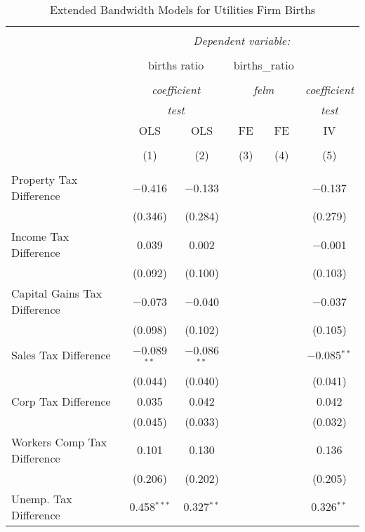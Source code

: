 
\begin{table}[!htbp] \centering 
  \caption{Extended Bandwidth Models for  Utilities Firm Births} 
  \label{} 
\begin{tabular}{@{\extracolsep{5pt}}lccccc} 
\\[-1.8ex]\hline 
\hline \\[-1.8ex] 
 & \multicolumn{5}{c}{\textit{Dependent variable:}} \\ 
\cline{2-6} 
\\[-1.8ex] & \multicolumn{2}{c}{births ratio} & \multicolumn{2}{c}{births\_ratio} &   \\ 
\\[-1.8ex] & \multicolumn{2}{c}{\textit{coefficient}} & \multicolumn{2}{c}{\textit{felm}} & \textit{coefficient} \\ 
 & \multicolumn{2}{c}{\textit{test}} & \multicolumn{2}{c}{\textit{}} & \textit{test} \\ 
 & OLS & OLS & FE & FE & IV \\ 
\\[-1.8ex] & (1) & (2) & (3) & (4) & (5)\\ 
\hline \\[-1.8ex] 
 Property Tax Difference & $-$0.416 & $-$0.133 &  &  & $-$0.137 \\ 
  & (0.346) & (0.284) &  &  & (0.279) \\ 
  Income Tax Difference & 0.039 & 0.002 &  &  & $-$0.001 \\ 
  & (0.092) & (0.100) &  &  & (0.103) \\ 
  Capital Gains Tax Difference & $-$0.073 & $-$0.040 &  &  & $-$0.037 \\ 
  & (0.098) & (0.102) &  &  & (0.105) \\ 
  Sales Tax Difference & $-$0.089$^{**}$ & $-$0.086$^{**}$ &  &  & $-$0.085$^{**}$ \\ 
  & (0.044) & (0.040) &  &  & (0.041) \\ 
  Corp Tax Difference & 0.035 & 0.042 &  &  & 0.042 \\ 
  & (0.045) & (0.033) &  &  & (0.032) \\ 
  Workers Comp Tax Difference & 0.101 & 0.130 &  &  & 0.136 \\ 
  & (0.206) & (0.202) &  &  & (0.205) \\ 
  Unemp. Tax Difference & 0.458$^{***}$ & 0.327$^{**}$ &  &  & 0.326$^{**}$ \\ 

\end{tabular}
\end{table}
